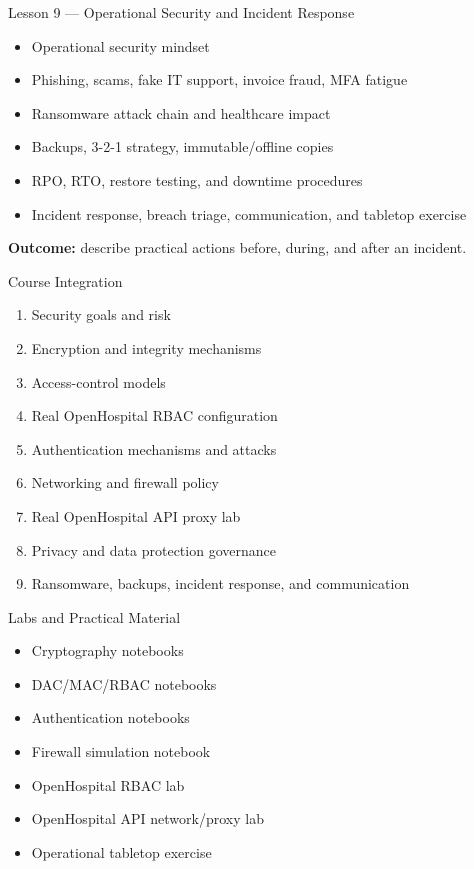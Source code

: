 \documentclass[presentation]{beamer}
\begin{document}
\begin{frame}[c]{Lesson 9 --- Operational Security and Incident Response}
\begin{itemize}
    \item Operational security mindset
    \item Phishing, scams, fake IT support, invoice fraud, MFA fatigue
    \item Ransomware attack chain and healthcare impact
    \item Backups, 3-2-1 strategy, immutable/offline copies
    \item RPO, RTO, restore testing, and downtime procedures
    \item Incident response, breach triage, communication, and tabletop exercise
\end{itemize}
\bigskip
\textbf{Outcome:} describe practical actions before, during, and after an incident.
\end{frame}

\begin{frame}[c]{Course Integration}
\begin{enumerate}
    \item Security goals and risk
    \item Encryption and integrity mechanisms
    \item Access-control models
    \item Real OpenHospital RBAC configuration
    \item Authentication mechanisms and attacks
    \item Networking and firewall policy
    \item Real OpenHospital API proxy lab
    \item Privacy and data protection governance
    \item Ransomware, backups, incident response, and communication
\end{enumerate}
\end{frame}

\begin{frame}[c]{Labs and Practical Material}
\begin{itemize}
    \item Cryptography notebooks
    \item DAC/MAC/RBAC notebooks
    \item Authentication notebooks
    \item Firewall simulation notebook
    \item OpenHospital RBAC lab
    \item OpenHospital API network/proxy lab
    \item Operational tabletop exercise
\end{itemize}
\end{frame}
\end{document}
